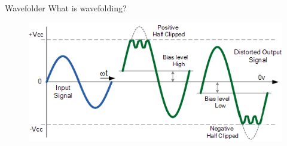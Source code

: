 \begin{frame}
\end{frame}

\begin{frame}{Wavefolder}
    What is wavefolding?
    \begin{figure}
        \centering
        \includegraphics[width=4.5in]{Figures/wavefold.png}
    \end{figure}
\end{frame}

